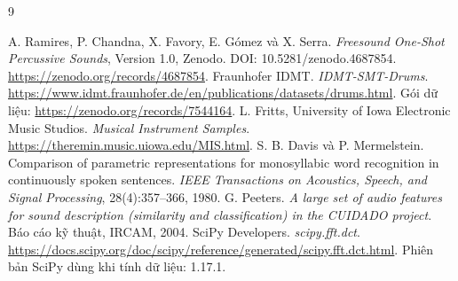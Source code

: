 \documentclass[11pt,a4paper]{article}
\begin{document}
\begin{thebibliography}{9}
 A. Ramires, P. Chandna, X. Favory, E. Gómez và X. Serra. \emph{Freesound One-Shot Percussive Sounds}, Version 1.0, Zenodo. DOI: 10.5281/zenodo.4687854. \url{https://zenodo.org/records/4687854}.
 Fraunhofer IDMT. \emph{IDMT-SMT-Drums}. \url{https://www.idmt.fraunhofer.de/en/publications/datasets/drums.html}. Gói dữ liệu: \url{https://zenodo.org/records/7544164}.
 L. Fritts, University of Iowa Electronic Music Studios. \emph{Musical Instrument Samples}. \url{https://theremin.music.uiowa.edu/MIS.html}.
 S. B. Davis và P. Mermelstein. Comparison of parametric representations for monosyllabic word recognition in continuously spoken sentences. \emph{IEEE Transactions on Acoustics, Speech, and Signal Processing}, 28(4):357--366, 1980.
 G. Peeters. \emph{A large set of audio features for sound description (similarity and classification) in the CUIDADO project}. Báo cáo kỹ thuật, IRCAM, 2004.
 SciPy Developers. \emph{scipy.fft.dct}. \url{https://docs.scipy.org/doc/scipy/reference/generated/scipy.fft.dct.html}. Phiên bản SciPy dùng khi tính dữ liệu: 1.17.1.
\end{thebibliography}
\end{document}
